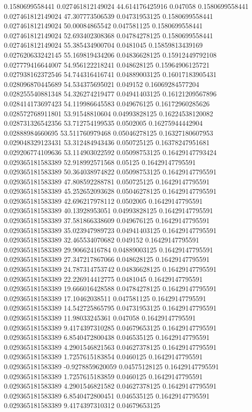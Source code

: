 0.1580699558441 0.027461812149024 44.614176425916 0.047058
0.1580699558441 0.027461812149024 47.307773506539 0.04731953125
0.1580699558441 0.027461812149024 50.00084865542 0.047581125
0.1580699558441 0.027461812149024 52.693402308368 0.04784278125
0.1580699558441 0.027461812149024 55.385434900704 0.0481045
0.15859813439169 0.027620633242145 55.169819434206 0.04836628125
0.15912449792108 0.027779416644007 54.956122218241 0.048628125
0.15964906125721 0.027938162372546 54.744316416741 0.04889003125
0.16017183905431 0.028096870445689 54.534375695021 0.049152
0.16069284577204 0.028255540881348 54.326274219477 0.04941403125
0.16121209567896 0.028414173697423 54.119986645583 0.049676125
0.16172960285626 0.028572768911801 53.91548810604 0.04993828125
0.16224538120082 0.028731326542356 53.712754199535 0.0502005
0.16275944442904 0.02888984660695 53.511760979468 0.05046278125
0.16327180607953 0.029048329123431 53.312484943436 0.050725125
0.16378247951681 0.029206774109636 53.114903022592 0.05098753125
0.16429147793424 0.029365181583389 52.918992571568 0.05125
0.16429147795591 0.029365181583389 50.364038974822 0.05098753125
0.16429147795591 0.029365181583389 47.808592288781 0.050725125
0.16429147795591 0.029365181583389 45.252652093628 0.05046278125
0.16429147795591 0.029365181583389 42.696217978112 0.0502005
0.16429147795591 0.029365181583389 40.13928953051 0.04993828125
0.16429147795591 0.029365181583389 37.581866338609 0.049676125
0.16429147795591 0.029365181583389 35.023947989723 0.04941403125
0.16429147795591 0.029365181583389 32.465534070682 0.049152
0.16429147795591 0.029365181583389 29.90662416784 0.04889003125
0.16429147795591 0.029365181583389 27.347217867066 0.048628125
0.16429147795591 0.029365181583389 24.787314753742 0.04836628125
0.16429147795591 0.029365181583389 22.226914412775 0.0481045
0.16429147795591 0.029365181583389 19.666016428588 0.04784278125
0.16429147795591 0.029365181583389 17.10462038511 0.047581125
0.16429147795591 0.029365181583389 14.542725865795 0.04731953125
0.16429147795591 0.029365181583389 11.98033245361 0.047058
0.16429147795591 0.029365181583389 9.4174397310285 0.04679653125
0.16429147795591 0.029365181583389 6.8540472800438 0.046535125
0.16429147795591 0.029365181583389 4.2901546821563 0.04627378125
0.16429147795591 0.029365181583389 1.7257615183854 0.0460125
0.16429147795591 0.029365181583389 -0.9278859620059 0.04575128125
0.16429147795591 0.029365181583389 1.7257615183859 0.0460125
0.16429147795591 0.029365181583389 4.2901546821582 0.04627378125
0.16429147795591 0.029365181583389 6.8540472800451 0.046535125
0.16429147795591 0.029365181583389 9.4174397310312 0.04679653125
